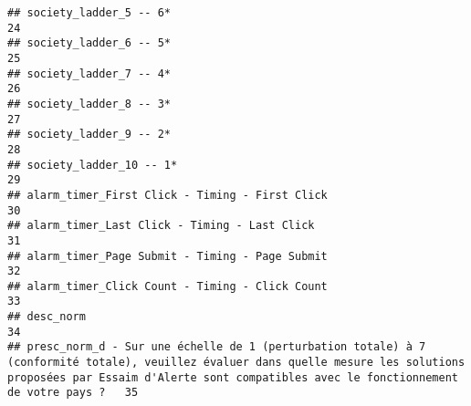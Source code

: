 \documentclass[
]{article}
\begin{document}
\begin{verbatim}
## society_ladder_5 -- 6*                                                                                                                                                                                                       24
## society_ladder_6 -- 5*                                                                                                                                                                                                       25
## society_ladder_7 -- 4*                                                                                                                                                                                                       26
## society_ladder_8 -- 3*                                                                                                                                                                                                       27
## society_ladder_9 -- 2*                                                                                                                                                                                                       28
## society_ladder_10 -- 1*                                                                                                                                                                                                      29
## alarm_timer_First Click - Timing - First Click                                                                                                                                                                               30
## alarm_timer_Last Click - Timing - Last Click                                                                                                                                                                                 31
## alarm_timer_Page Submit - Timing - Page Submit                                                                                                                                                                               32
## alarm_timer_Click Count - Timing - Click Count                                                                                                                                                                               33
## desc_norm                                                                                                                                                                                                                    34
## presc_norm_d - Sur une échelle de 1 (perturbation totale) à 7 (conformité totale), veuillez évaluer dans quelle mesure les solutions proposées par Essaim d'Alerte sont compatibles avec le fonctionnement de votre pays ?   35

\end{verbatim}
\end{document}
